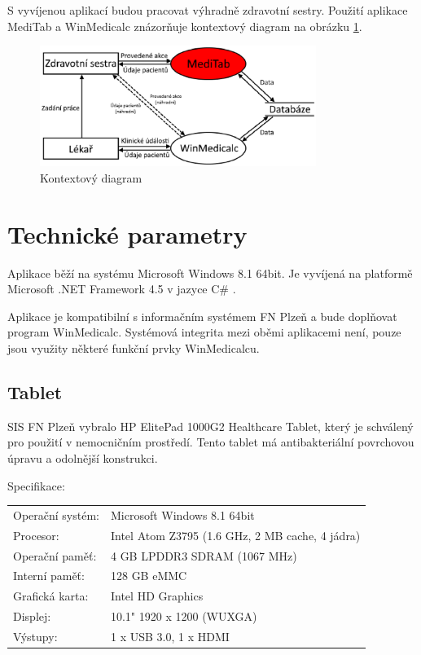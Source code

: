 S vyvíjenou aplikací budou pracovat výhradně zdravotní sestry. Použití aplikace MediTab a WinMedicalc znázorňuje kontextový diagram na obrázku \ref{fig:kontext}.

\begin{figure}[H]
	\centering
	\includegraphics[width=0.8\textwidth]{img/kontext.eps}
	\caption{Kontextový diagram}
  \label{fig:kontext}
\end{figure}


\section{Technické parametry}

Aplikace běží na systému Microsoft Windows 8.1 64bit. Je vyvíjená na platformě Microsoft .NET Framework 4.5 v jazyce C\# \cite{msdn}.

Aplikace je kompatibilní s informačním systémem FN Plzeň a bude doplňovat program WinMedicalc. Systémová integrita mezi oběmi aplikacemi není, pouze jsou využity některé funkční prvky WinMedicalcu.

\subsection{Tablet}

SIS FN Plzeň vybralo HP ElitePad 1000G2 Healthcare Tablet, který je schválený pro použití v nemocničním prostředí. Tento tablet má antibakteriální povrchovou úpravu a odolnější konstrukci.

\noindent
Specifikace:

\noindent
\begin{tabular}{l l}
	Operační systém: & Microsoft Windows 8.1 64bit\\
	Procesor: & Intel Atom Z3795 (1.6 GHz, 2 MB cache, 4 jádra)\\
	Operační paměť: & 4 GB LPDDR3 SDRAM (1067 MHz)\\
	Interní paměť: & 128 GB eMMC\\
	Grafická karta: & Intel HD Graphics\\
	Displej: & 10.1" 1920 x 1200 (WUXGA)\\
	Výstupy: & 1 x USB 3.0, 1 x HDMI
\end{tabular}


